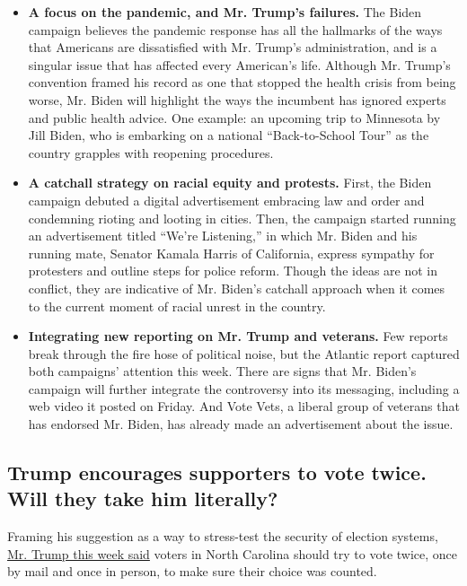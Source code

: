 \begin{itemize}
\item
  \textbf{A focus on the pandemic, and Mr. Trump's failures.} The Biden
  campaign believes the pandemic response has all the hallmarks of the
  ways that Americans are dissatisfied with Mr. Trump's administration,
  and is a singular issue that has affected every American's life.
  Although Mr. Trump's convention framed his record as one that stopped
  the health crisis from being worse, Mr. Biden will highlight the ways
  the incumbent has ignored experts and public health advice. One
  example: an upcoming trip to Minnesota by Jill Biden, who is embarking
  on a national ``Back-to-School Tour'' as the country grapples with
  reopening procedures.
\item
  \textbf{A catchall strategy on racial equity and protests.} First, the
  Biden campaign debuted a digital advertisement embracing law and order
  and condemning rioting and looting in cities. Then, the campaign
  started running an advertisement titled ``We're Listening,'' in which
  Mr. Biden and his running mate, Senator Kamala Harris of California,
  express sympathy for protesters and outline steps for police reform.
  Though the ideas are not in conflict, they are indicative of Mr.
  Biden's catchall approach when it comes to the current moment of
  racial unrest in the country.
\item
  \textbf{Integrating new reporting on Mr. Trump and veterans.} Few
  reports break through the fire hose of political noise, but the
  Atlantic report captured both campaigns' attention this week. There
  are signs that Mr. Biden's campaign will further integrate the
  controversy into its messaging, including a web video it posted on
  Friday. And Vote Vets, a liberal group of veterans that has endorsed
  Mr. Biden, has already made an advertisement about the issue.
\end{itemize}

\hypertarget{trump-encourages-supporters-to-vote-twice-will-they-take-him-literally}{%
\subsection{Trump encourages supporters to vote twice. Will they take
him
literally?}\label{trump-encourages-supporters-to-vote-twice-will-they-take-him-literally}}

Framing his suggestion as a way to stress-test the security of election
systems,
\href{https://www.nytimes3xbfgragh.onion/2020/09/03/us/politics/people-voting-twice-trump.html}{Mr.
Trump this week said} voters in North Carolina should try to vote twice,
once by mail and once in person, to make sure their choice was counted.

